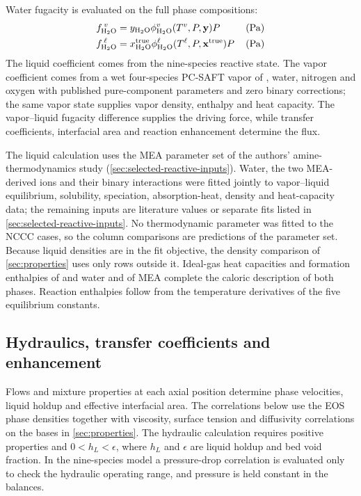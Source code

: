 Water fugacity is evaluated on the full phase compositions:
\begin{align}
f^{\:\vap}_{ \HtwoO} &= y_{\HtwoO}\phi^{\vap}_{\HtwoO}(T^\vap,P,\mathbf y)P && \left(\unit{Pa} \right)\\
f^{\:\liq}_{ \HtwoO} &= x^{\mathrm{true}}_{\HtwoO}\phi^{\liq}_{\HtwoO}(T^\liq,P,\mathbf x^{\mathrm{true}})P && \left(\unit{Pa} \right)
\end{align}
The liquid coefficient comes from the nine-species reactive state.
The vapor coefficient comes from a wet four-species PC-SAFT vapor of \COtwo{}, water, nitrogen and oxygen with published pure-component parameters \cite{Gross2001,Schick2023} and zero binary corrections; the same vapor state supplies vapor density, enthalpy and heat capacity.
The vapor--liquid fugacity difference supplies the driving force, while transfer coefficients, interfacial area and reaction enhancement determine the flux.

The liquid calculation uses the MEA parameter set of the authors' amine-thermodynamics study (\cref{sec:selected-reactive-inputs}).
Water, the two MEA-derived ions and their binary interactions were fitted jointly to vapor--liquid equilibrium, \COtwo{} solubility, speciation, absorption-heat, density and heat-capacity data; the remaining inputs are literature values or separate fits listed in \cref{sec:selected-reactive-inputs}.
No thermodynamic parameter was fitted to the NCCC cases, so the column comparisons are predictions of the parameter set.
Because liquid densities are in the fit objective, the density comparison of \cref{sec:properties} uses only rows outside it.
Ideal-gas heat capacities and formation enthalpies of \COtwo{} and water \cite{chaseNISTJANAFThermochemicalTables1998,internationalassociationforthepropertiesofwaterandsteamRevisedReleaseIAPWS2018} and of MEA \cite{Zhang2011} complete the caloric description of both phases.
Reaction enthalpies follow from the temperature derivatives of the five equilibrium constants.

\subsection{Hydraulics, transfer coefficients and enhancement}\label{subsec:transport}
Flows and mixture properties at each axial position determine phase velocities, liquid holdup and effective interfacial area.
The correlations below use the EOS phase densities together with viscosity, surface tension and diffusivity correlations on the bases in \cref{sec:properties}.
The hydraulic calculation requires positive properties and $0<h_L<\epsilon$, where $h_L$ and $\epsilon$ are liquid holdup and bed void fraction.
In the nine-species model a pressure-drop correlation is evaluated only to check the hydraulic operating range, and pressure is held constant in the balances.


